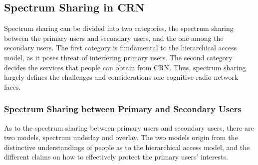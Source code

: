 \subsection{Spectrum Sharing in CRN}
\label{spectrum_sharing}
Spectrum sharing can be divided into two categories, the spectrum sharing between the primary users and secondary users, and the one among the secondary users.
The first category is fundamental to the hierarchical access model, as it poses threat of interfering primary users.
The second category decides the services that people can obtain from CRN.
Thus, spectrum sharing largely defines the challenges and considerations one cognitive radio network faces.


\subsubsection{Spectrum Sharing between Primary and Secondary Users}
As to the spectrum sharing between primary users and secondary users, there are two models, spectrum underlay and overlay.
The two models origin from the distinctive understandings of people as to the hierarchical access model, and the different claims on how to effectively protect the primary users' interests.


